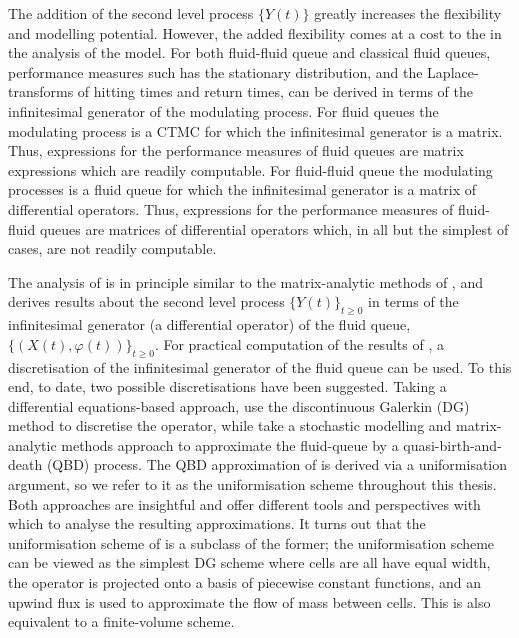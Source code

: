 The addition of the second level process \(\{Y(t)\}\) greatly increases the flexibility and modelling potential. However, the added flexibility comes at a cost to the in the analysis of the model. For both fluid-fluid queue and classical fluid queues, performance measures such has the stationary distribution, and the Laplace-transforms of hitting times and return times, can be derived in terms of the infinitesimal generator of the modulating process. For fluid queues the modulating process is a CTMC for which the infinitesimal generator is a matrix. Thus, expressions for the performance measures of fluid queues are matrix expressions which are readily computable. For fluid-fluid queue the modulating processes is a fluid queue for which the infinitesimal generator is a matrix of differential operators. Thus, expressions for the performance measures of fluid-fluid queues are matrices of differential operators which, in all but the simplest of cases, are not readily computable. 

The analysis of \cite{bo2014} is in principle similar to the matrix-analytic methods of \cite{bean2005}, and derives results about the second level process \(\{Y(t)\}_{t\geq0}\) in terms of the infinitesimal generator (a differential operator) of the fluid queue, \(\{(X(t),\varphi(t))\}_{t\geq0}\). For practical computation of the results of \cite{bo2014}, a discretisation of the infinitesimal generator of the fluid queue can be used. To this end, to date, two possible discretisations have been suggested. Taking a differential equations-based approach, \cite{blnos2022} use the discontinuous Galerkin (DG) method to discretise the operator, while \cite{bo2013} take a stochastic modelling and matrix-analytic methods approach to approximate the fluid-queue by a quasi-birth-and-death (QBD) process. The QBD approximation of \cite{bo2013} is derived via a uniformisation argument, so we refer to it as the uniformisation scheme throughout this thesis. Both approaches are insightful and offer different tools and perspectives with which to analyse the resulting approximations. It turns out that the uniformisation scheme of \cite{bo2013} is a subclass of the former; the uniformisation scheme can be viewed as the simplest DG scheme where cells are all have equal width, the operator is projected onto a basis of piecewise constant functions, and an upwind flux is used to approximate the flow of mass between cells. This is also equivalent to a finite-volume scheme.


